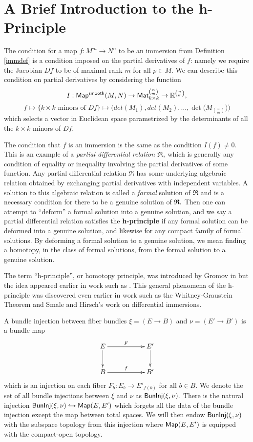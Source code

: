 \section{A Brief Introduction to the h-Principle} 
The condition for a map $f \colon M^{m} \rightarrow N^{n}$ to be an immersion from Definition \ref{immdef} is a condition imposed on the partial derivatives of $f$: namely we require the Jacobian $Df$ to be of maximal rank $m$ for all $p \in M.$ We can describe this condition on partial derivatives by considering the function 
\[
I : {\sf Map^{smooth}}(M, N) \rightarrow {\sf Mat}_{k \times k}^{n \choose m} \rightarrow \mathbb R^{n \choose m},
\]
\[
f \mapsto \{k \times k \text{ minors of } Df\} \mapsto \Bigg(det(M_{1}), det(M_{2}), \hdots, \det\Big(M_{n \choose m}\Big)\Bigg)
\]
which selects a vector in Euclidean space parametrized by the determinants of all the $k \times k$ minors of $Df.$

The condition that $f$ is an immersion is the same as the condition $I(f) \neq 0.$ This is an example of a \textit{partial differential relation} $\frak{R},$ which is generally any condition of equality or inequality involving the partial derivatives of some function. Any partial differential relation $\mathfrak{R}$ has some underlying algebraic relation obtained by exchanging partial derivatives with independent variables. A solution to this algebraic relation is called a \textit{formal} solution of $\mathfrak{R}$ and is a necessary condition for there to be a genuine solution of $\frak{R}.$ Then one can attempt to ``deform'' a formal solution into a genuine solution, and we say a partial differential relation satisfies the \textbf{h-principle} if any formal solution can be deformed into a genuine solution, and likewise for any compact family of formal solutions. By deforming a formal solution to a genuine solution, we mean finding a homotopy, in the class of formal solutions, from the formal solution to a genuine solution.


The term ``h-principle'', or homotopy principle, was introduced by Gromov in \cite{hprinc2} but the idea appeared earlier in work such as \cite{hprinc1}. This general phenomena of the h-principle was discovered even earlier in work such as the Whitney-Graustein Theorem and Smale and Hirsch's work on differential immersions.  


A bundle injection between fiber bundles $\xi = (E \rightarrow B)$ and $\nu = (E' \rightarrow B')$ is a bundle map
\[
\xymatrix{
E \ar[rr]^-{F} \ar[d]^-{}
&&
E' \ar[d]^-{}
\\
B \ar[rr]^-{f}
&&
B'
}
\]
which is an injection on each fiber $F_{b} \colon E_{b} \rightarrow E'_{f(b)}$ for all $b \in B.$ We denote the set of all bundle injections between $\xi$ and $\nu$ as ${\sf BunInj}(\xi, \nu).$ There is the natural injection ${\sf BunInj}(\xi, \nu) \hookrightarrow {\sf Map}(E, E')$ which forgets all the data of the bundle injection except the map between total spaces. We will then endow ${\sf BunInj}(\xi, \nu)$ with the subspace topology from this injection where ${\sf Map}(E, E')$ is equipped with the compact-open topology.

